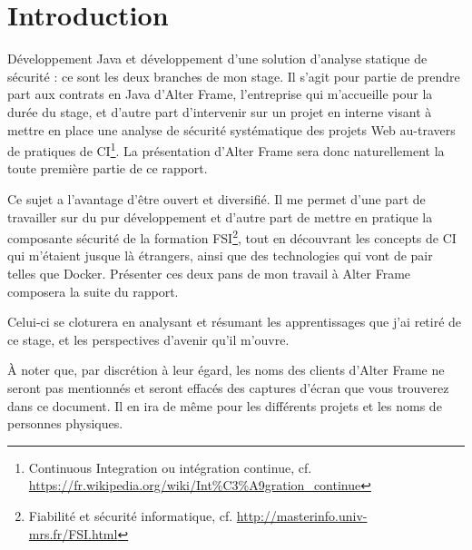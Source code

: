 \section{Introduction}
Développement Java et développement d'une solution d'analyse statique de sécurité : ce sont les deux branches de mon stage. Il s'agit pour partie de prendre part aux contrats en Java d'Alter Frame, l'entreprise qui m'accueille pour la durée du stage, et d'autre part d'intervenir sur un projet en interne visant à mettre en place une analyse de sécurité systématique des projets Web au-travers de pratiques de CI\footnote{Continuous Integration ou intégration continue, cf. \url{https://fr.wikipedia.org/wiki/Int\%C3\%A9gration_continue}}. La présentation d'Alter Frame sera donc naturellement la toute première partie de ce rapport.

Ce sujet a l'avantage d'être ouvert et diversifié. Il me permet d'une part de travailler sur du pur développement et d'autre part de mettre en pratique la composante sécurité de la formation FSI\footnote{Fiabilité et sécurité informatique, cf. \url{http://masterinfo.univ-mrs.fr/FSI.html}}, tout en découvrant les concepts de CI qui m'étaient jusque là étrangers, ainsi que des technologies qui vont de pair telles que Docker. Présenter ces deux pans de mon travail à Alter Frame composera la suite du rapport.

Celui-ci se cloturera en analysant et résumant les apprentissages que j'ai retiré de ce stage, et les perspectives d'avenir qu'il m'ouvre.

À noter que, par discrétion à leur égard, les noms des clients d'Alter Frame ne seront pas mentionnés et seront effacés des captures d'écran que vous trouverez dans ce document. Il en ira de même pour les différents projets et les noms de personnes physiques.